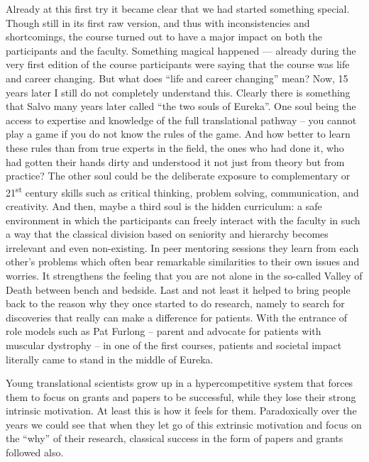 \documentclass[authordate, editorial, issue]{jote-new-article}
\begin{document}
	Already at this first try it became clear that we had started something special. Though still in its first raw version, and thus with inconsistencies and shortcomings, the course turned out to have a major impact on both the participants and the faculty. Something magical happened — already during the very first edition of the course participants were saying that the course was life and career changing. But what does “life and career changing” mean? Now, 15 years later I still do not completely understand this. Clearly there is something that Salvo many years later called “the two souls of Eureka”. One soul being the access to expertise and knowledge of the full translational pathway -- you cannot play a game if you do not know the rules of the game. And how better to learn these rules than from true experts in the field, the ones who had done it, who had gotten their hands dirty and understood it not just from theory but from practice? The other soul could be the deliberate exposure to complementary or 21\textsuperscript{st} century skills such as critical thinking, problem solving, communication, and creativity. And then, maybe a third soul is the hidden curriculum: a safe environment in which the participants can freely interact with the faculty in such a way that the classical division based on seniority and hierarchy becomes irrelevant and even non-existing. In peer mentoring sessions they learn from each other's problems which often bear remarkable similarities to their own issues and worries. It strengthens the feeling that you are not alone in the so-called Valley of Death between bench and bedside. Last and not least it helped to bring people back to the reason why they once started to do research, namely to search for discoveries that really can make a difference for patients. With the entrance of role models such as Pat Furlong -- parent and advocate for patients with muscular dystrophy -- in one of the first courses, patients and societal impact literally came to stand in the middle of Eureka.



	Young translational scientists grow up in a hypercompetitive system that forces them to focus on grants and papers to be successful, while they lose their strong intrinsic motivation. At least this is how it feels for them. Paradoxically over the years we could see that when they let go of this extrinsic motivation and focus on the “why” of their research, classical success in the form of papers and grants followed also.
\end{document}
